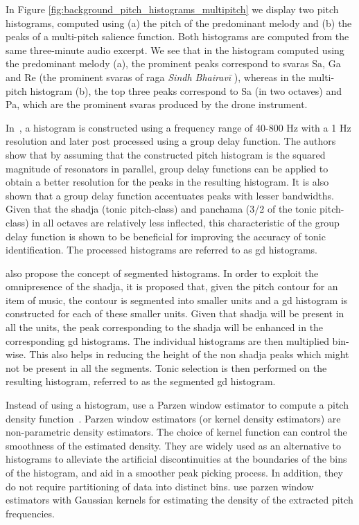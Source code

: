 {In Figure \ref{fig:background_pitch_histograms_multipitch} we display two pitch histograms, computed using (a) the pitch of the predominant melody and (b) the peaks of a multi-pitch salience function. Both histograms are computed from the same three-minute audio excerpt. We see that in the histogram computed using the predominant melody (a), the prominent peaks correspond to \glspl{svara} Sa, Ga and Re (the prominent \glspl{svara} of \gls{raga} \textit{Sindh Bhairav\={i}} ), whereas in the multi-pitch histogram (b), the top three peaks correspond to Sa (in two octaves) and Pa, which are the prominent \glspl{svara} produced by the drone instrument. 

In~\cite{Ashwin_Istanbul2012}, a histogram is constructed using a frequency range of 40-800 Hz with a 1 Hz resolution and later post processed using a group delay function. The authors show that by assuming that the constructed pitch histogram is the squared magnitude of resonators in parallel, group delay functions can be applied to obtain a better resolution for the peaks in the resulting histogram. It is also shown that a group delay function accentuates peaks with lesser bandwidths. Given that the \gls{shadja} (tonic pitch-class) and panchama (3/2 of the tonic pitch-class) in all octaves are relatively less inflected, this characteristic of the group delay function is shown to be beneficial for improving the accuracy of tonic identification. The processed histograms are referred to as \gls{gd} histograms.

\cite{Ashwin_Istanbul2012} also propose the concept of segmented histograms. In order to exploit the omnipresence of the \gls{shadja},  it is proposed that, given the pitch contour for an item of music, the contour is segmented into smaller units and a \gls{gd} histogram is constructed for each of these smaller units. Given that \gls{shadja} will be present in all the units, the peak corresponding to the \gls{shadja} will be enhanced in the corresponding \gls{gd} histograms. The individual histograms are then multiplied bin-wise. This also helps in reducing the height of the non \gls{shadja} peaks which might not be present in all the segments. Tonic selection is then performed on the resulting histogram, referred to as the segmented \gls{gd} histogram.

Instead of using a histogram, \cite{ranjani2011carnatic} use a Parzen window estimator to compute a pitch density function~\citep{Bishop,DudaHart2000}. Parzen window estimators (or kernel density estimators) are non-parametric density estimators. The choice of kernel function can control the smoothness of the estimated density. They are widely used as an alternative to histograms to alleviate the artificial discontinuities at the boundaries of the bins of the histogram, and aid in a smoother peak picking process. In addition, they do not require partitioning of data into distinct bins. \cite{ranjani2011carnatic} use parzen window estimators with Gaussian kernels for estimating the density of the extracted pitch frequencies.


}
